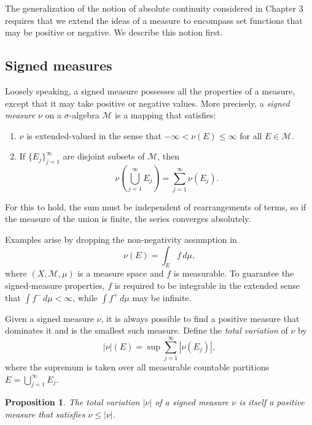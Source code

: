 \documentclass[11pt,openany]{book}
\newtheorem{proposition}[theorem]{Proposition}
\begin{document}
The generalization of the notion of absolute continuity considered in Chapter 3 requires that we extend the ideas of a measure to encompass set functions that may be positive or negative. We describe this notion first.

\subsection{Signed measures}

Loosely speaking, a signed measure possesses all the properties of a measure, except that it may take positive or negative values. More precisely, a \emph{signed measure} $\nu$ on a $\sigma$-algebra $\mathcal M$ is a mapping that satisfies:
\begin{enumerate}
\item[(i)] $\nu$ is extended-valued in the sense that $-\infty<\nu(E)\leq\infty$ for all $E\in\mathcal M$.
\item[(ii)] If $\{E_j\}_{j=1}^{\infty}$ are disjoint subsets of $\mathcal M$, then
\[
\nu\left(\bigcup_{j=1}^{\infty}E_j\right)=\sum_{j=1}^{\infty}\nu(E_j).
\]
\end{enumerate}
For this to hold, the sum must be independent of rearrangements of terms, so if the measure of the union is finite, the series converges absolutely.

Examples arise by dropping the non-negativity assumption in
\[
\nu(E)=\int_E f\,d\mu,
\]
where $(X,\mathcal M,\mu)$ is a measure space and $f$ is measurable. To guarantee the signed-measure properties, $f$ is required to be integrable in the extended sense that $\int f^-\,d\mu<\infty$, while $\int f^+\,d\mu$ may be infinite.

Given a signed measure $\nu$, it is always possible to find a positive measure that dominates it and is the smallest such measure. Define the \emph{total variation} of $\nu$ by
\[
|\nu|(E)=\sup\sum_{j=1}^{\infty}|\nu(E_j)|,
\]
where the supremum is taken over all measurable countable partitions $E=\bigcup_{j=1}^{\infty}E_j$.

\begin{proposition}
The total variation $|\nu|$ of a signed measure $\nu$ is itself a positive measure that satisfies $\nu\leq|\nu|$.
\end{proposition}
\end{document}
